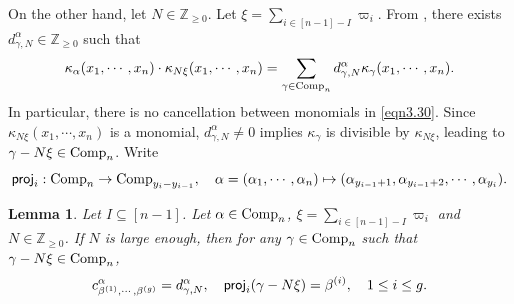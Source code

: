 \documentclass[12pt]{amsart}
\newtheorem{lemma}[theorem]{Lemma}
\theoremstyle{definition}
\theoremstyle{remark}
\newcommand{\Z}{\mathbb{Z}}
\begin{document}
On the other hand, let $N \in \Z_{\geq 0}$. Let $\xi = \sum_{i \in [n-1]-I} \varpi_i$. From \cite[Theorem~1]{MR1016897}, there exists $d_{\gamma , N}^{\alpha} \in \Z_{\geq 0}$ such that
\begin{equation}\label{eqn3.30}
\kappa_{\alpha}(x_1 , \cdots , x_n) \cdot \kappa_{N \xi} (x_1 , \cdots , x_n) = \sum_{\gamma \in {\rm Comp}_n}  d_{\gamma , N}^{\alpha} \kappa_{\gamma} (x_1 , \cdots , x_n).
\end{equation}
In particular, there is no cancellation between monomials in \eqref{eqn3.30}. Since $\kappa_{N\xi}(x_1 , \cdots , x_n)$ is a monomial, $d_{\gamma , N}^{\alpha} \neq 0$ implies $\kappa_{\gamma}$ is divisible by $\kappa_{N\xi}$, leading to $\gamma - N \xi \in {\rm Comp}_n$. Write
\begin{equation}
{\sf proj}_i : {\rm Comp}_n \rightarrow {\rm Comp}_{y_{i} - y_{i-1}}, \quad \alpha = (\alpha_1, \cdots , \alpha_n) \mapsto (\alpha_{y_{i-1}+1} , \alpha_{y_{i-1}+2} ,\cdots , \alpha_{y_i}).
\end{equation}

\begin{lemma}\label{lem3.4}
Let $I \subseteq [n-1]$. Let $\alpha \in {\rm Comp}_n$, $\xi = \sum_{i \in [n-1]-I} \varpi_i$ and $N \in \Z_{\geq 0}$. If $N$ is large enough, then for any $\gamma \in {\rm Comp}_n$ such that $\gamma - N \xi \in {\rm Comp}_n$,
\begin{equation}
c_{\beta^{(1)} , \cdots , \beta^{(g)}}^\alpha = d_{\gamma , N}^\alpha, \quad {\sf proj}_i (\gamma - N \xi) = \beta^{(i)} , \quad 1 \leq i \leq g.
\end{equation}
\end{lemma}
\end{document}
